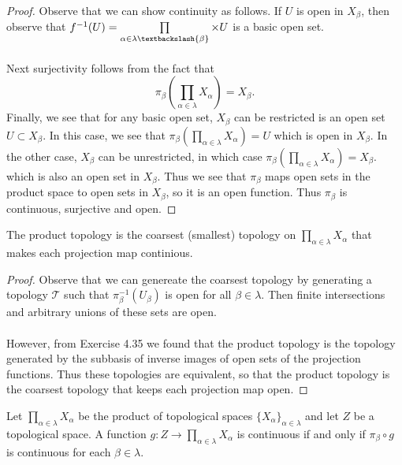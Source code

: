 \documentclass[letter,12pt,twoside]{hmcpset}
\begin{document}
\begin{proof}
    Observe that we can show continuity as follows. If $U$ is open in
    $X_\beta$, then observe that $f^{-1}(U) =
    \prod\limits_{\alpha \in \lambda\textbackslash\{\beta\} }\times U$
    is a basic open set. 
    \\
    \\
    Next surjectivity follows from the fact that 
    \[
        \pi_\beta\left(\prod\limits_{\alpha \in \lambda}X_\alpha \right) = X_\beta.
    \]
    Finally, we see that for any basic open set, $X_\beta$ can be
    restricted is an open set $U \subset X_\beta$. In this case, we
    see that $\pi_\beta\left(\prod\limits_{\alpha \in \lambda}X_\alpha
    \right) = U$ which is open in $X_\beta$. In the other case,
    $X_\beta$ can be unrestricted, in which case $\pi_\beta\left(\prod\limits_{\alpha \in \lambda}X_\alpha
    \right) = X_\beta$. which is also an open set in $X_\beta$. Thus
    we see that $\pi_\beta$ maps open sets in the product space
    to open sets in $X_\beta$, so it is an open function. Thus
    $\pi_\beta$ is continuous, surjective and open. 
    
\end{proof}


\begin{problem}[Theorem 8.39]
    The product topology is the coarsest (smallest) topology on
    $\prod_{\alpha \in \lambda} X_\alpha$ that makes each projection map
    continious.  
\end{problem}

\begin{proof}
    Observe that we can genereate the coarsest topology by generating
    a topology $\mathscr{T}$ such that $\pi_\beta^{-1}(U_\beta)$ is
    open for all $\beta \in \lambda$. Then finite intersections and
    arbitrary unions of these sets are open. 
    \\
    \\
    However, from Exercise 4.35 we found that the product topology is
    the topology generated by the subbasis of inverse images of open
    sets of the projection functions. Thus these topologies are
    equivalent, so that the product topology is the coarsest topology
    that keeps each projection map open.
\end{proof}

\begin{problem}[Theorem 8.40]
    Let $\prod\limits_{\alpha \in \lambda} X_\alpha$ be the product of
    topological spaces $\{X_\alpha\}_{\alpha \in \lambda}$ and let $Z$
    be a topological space. A function $g : Z \to \prod\limits_{\alpha
    \in \lambda}X_\alpha$ is continuous if and only if $\pi_\beta
    \circ g$ is continuous for each $\beta \in \lambda$.
\end{problem}
\end{document}
